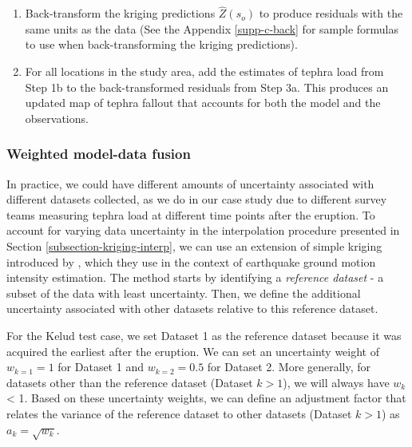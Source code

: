 \documentclass[a4paper,fleqn]{cas-sc}
\begin{document}
\begin{enumerate}
    \begin{enumerate}
    \item
    Back-transform the kriging predictions $\hat{Z}(s_{o})$ to produce residuals with the same units as the data (See the Appendix \ref{supp-c-back} for sample formulas to use when back-transforming the kriging predictions).
     
    \item
    For all locations in the study area, add the estimates of tephra load from Step 1b to the back-transformed residuals from Step 3a. This produces an updated map of tephra fallout that accounts for both the model and the observations.
        
    \end{enumerate}
    
    
    
\end{enumerate}


\subsubsection{Weighted model-data fusion} \label{subsection-kriging-worden}

    In practice, we could have different amounts of uncertainty associated with different datasets collected, as we do in our case study due to different survey teams measuring tephra load at different time points after the eruption. To account for varying data uncertainty in the interpolation procedure presented in Section \ref{subsection-kriging-interp}, we can use an extension of simple kriging introduced by \cite{worden2018}, which they use in the context of earthquake ground motion intensity estimation. The method starts by identifying a \textit{reference dataset} - a subset of the data with least uncertainty. Then, we define the additional uncertainty associated with other datasets relative to this reference dataset.
  
    For the Kelud test case, we set Dataset 1 as the reference dataset because it was acquired the earliest after the eruption. We can set an uncertainty weight of $w_{k=1} = 1$ for Dataset 1 and $w_{k=2} = 0.5$ for Dataset 2. More generally, for datasets other than the reference dataset (Dataset $k > 1$), we will always have $w_{k}$ < 1. Based on these uncertainty weights, we can define an adjustment factor that relates the variance of the reference dataset to other datasets (Dataset $k > 1$) as $a_{k} = \sqrt{w_{k}}$.
  
\end{document}
